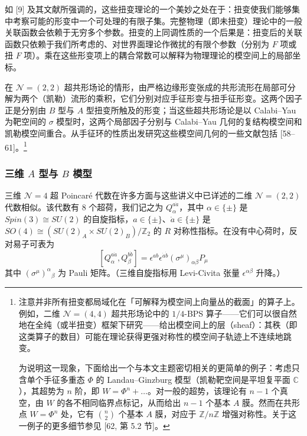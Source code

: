 如 [9] 及其文献所强调的，这些扭变理论的一个美妙之处在于：扭变使我们能够集中考察可能的形变中一个可处理的有限子集。完整物理（即未扭变）理论中的一般关联函数会依赖于无穷多个参数。扭变的上同调性质的一个后果是：扭变后的关联函数只依赖于我们所考虑的、对世界面理论作微扰的有限个参数（分别为 $F$ 项或扭 $F$ 项）。乘在这些形变项上的耦合常数可以解释为物理理论的模空间上的局部坐标。

在 $\mathcal{N}=(2,2)$ 超共形场论的情形，由严格边缘形变张成的共形流形在局部可分解为两个（凯勒）流形的乘积，它们分别对应手征形变与扭手征形变。这两个因子正是分别由 $B$ 型与 $A$ 型扭变所触及的形变；当这些超共形场论是以 Calabi–Yau 为靶空间的 $\sigma$ 模型时，这两个局部因子分别与 Calabi–Yau 几何的复结构模空间和凯勒模空间重合。从手征环的性质出发研究这些模空间几何的一些文献包括 [58–61]。\footnote{注意并非所有扭变都局域化在「可解释为模空间上向量丛的截面」的算子上。例如，二维 $\mathcal{N}=(4,4)$ 超共形场论中的 $1/4$-BPS 算子——它们可以很自然地在全纯（或半扭变）框架下研究——给出模空间上的层（sheaf）：其秩（即这类算子的数目）可能在理论获得更强对称性的模空间子轨迹上不连续地跳变。\par 为说明这一现象，下面给出一个与本文主题密切相关的更简单的例子：考虑只含单个手征多重态 $\Phi$ 的 Landau–Ginzburg 模型（凯勒靶空间是平坦复平面 $\mathbb{C}$），其超势为 $n$ 阶，即 $W = \Phi^n + \ldots$。对一般的超势，该理论有 $n-1$ 个真空，由 $W$ 的各不相同临界点标记，从而给出 $n-1$ 个基本 $A$ 膜。然而在共形点 $W = \Phi^n$ 处，它有 $\binom{n}{2}$ 个基本 $A$ 膜，对应于 $\mathbb{Z}/n\mathbb{Z}$ 增强对称性。关于这一例子的更多细节参见 [62, 第 5.2 节]。}

\subsubsection{三维 $A$ 型与 $B$ 模型}

三维 $\mathcal{N}=4$ 超 Poincaré 代数在许多方面与这些讲义中已详述的二维 $\mathcal{N}=(2,2)$ 代数相似。该代数有 8 个超荷，我们记之为 $Q_\alpha^{a\dot a}$，其中 $\alpha\in\{\pm\}$ 是 $Spin(3)\cong SU(2)$ 的自旋指标，$a\in\{\pm\}$、$\dot a\in\{\pm\}$ 是 $SO(4)\cong (SU(2)_A\times SU(2)_B)/\mathbb{Z}_2$ 的 $R$ 对称性指标。在没有中心荷时，反对易子可表为
\begin{equation}\tag{3.8}
[Q_\alpha^{a\dot a},Q_\beta^{b\dot b}]
= \epsilon^{ab}\epsilon^{\dot a\dot b}(\sigma^\mu)_{\alpha\beta}P_\mu
\end{equation}
其中 $(\sigma^\mu)^\alpha{}_\beta$ 为 Pauli 矩阵。（三维自旋指标用 Levi-Civita 张量 $\epsilon^{\alpha\beta}$ 升降。）

